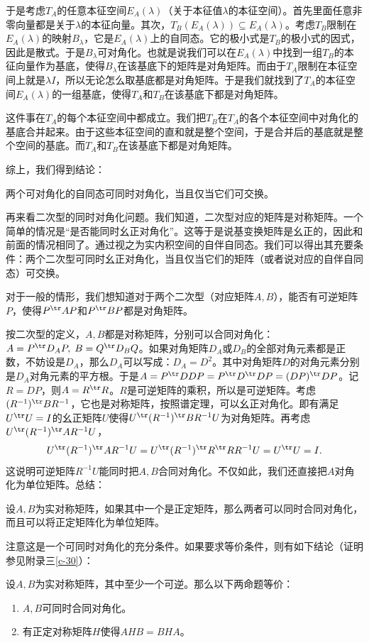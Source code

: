 \documentclass[12pt,UTF8,fontset=none]{ctexbook}
\begin{document}
于是考虑$T_A$的任意本征空间$E_A(\lambda)$（关于本征值$\lambda$的本征空间）。首先里面任意非零向量都是关于$\lambda$的本征向量。其次，$T_B(E_A(\lambda))\subseteq E_A(\lambda)$。考虑$T_B$限制在$E_A(\lambda)$的映射$B_{\lambda}$，它是$E_A(\lambda)$上的自同态。它的极小式是$T_B$的极小式的因式，因此是散式。于是$B_{\lambda}$可对角化。也就是说我们可以在$E_A(\lambda)$中找到一组$T_B$的本征向量作为基底，使得$B_{\lambda}$在该基底下的矩阵是对角矩阵。而由于$T_A$限制在本征空间上就是$\lambda I$，所以无论怎么取基底都是对角矩阵。于是我们就找到了$T_A$的本征空间$E_A(\lambda)$的一组基底，使得$T_A$和$T_B$在该基底下都是对角矩阵。

这件事在$T_A$的每个本征空间中都成立。我们把$T_B$在$T_A$的各个本征空间中对角化的基底合并起来。由于这些本征空间的直和就是整个空间，于是合并后的基底就是整个空间的基底。而$T_A$和$T_B$在该基底下都是对角矩阵。

综上，我们得到结论：
\begin{tm}
    两个可对角化的自同态可同时对角化，当且仅当它们可交换。
\end{tm}

再来看二次型的同时对角化问题。我们知道，二次型对应的矩阵是对称矩阵。一个简单的情况是“是否能同时幺正对角化”。这等于是说基变换矩阵是幺正的，因此和前面的情况相同了。通过视之为实内积空间的自伴自同态。我们可以得出其充要条件：两个二次型可同时幺正对角化，当且仅当它们的矩阵（或者说对应的自伴自同态）可交换。

对于一般的情形，我们想知道对于两个二次型（对应矩阵$A,B$），能否有可逆矩阵$P$，使得$P^{\tr}AP$和$P^{\tr}BP$都是对角矩阵。

按二次型的定义，$A,B$都是对称矩阵，分别可以合同对角化：$A = P^{\tr}D_AP,\; B = Q^{\tr}D_BQ$。如果对角矩阵$D_A$或$D_B$的全部对角元素都是正数，不妨设是$D_A$，那么$D_A$可以写成：$D_A = D^2$。其中对角矩阵$D$的对角元素分别是$D_A$对角元素的平方根。于是$A = P^{\tr}DDP = P^{\tr}D^{\tr}DP = (DP)^{\tr} DP$。记$R=DP$，则$A = R^{\tr} R$。$R$是可逆矩阵的乘积，所以是可逆矩阵。考虑$(R^{-1})^{\tr}BR^{-1}$，它也是对称矩阵，按照谱定理，可以幺正对角化。即有满足$U^{\tr}U=I$的幺正矩阵$U$使得$U^{\tr}(R^{-1})^{\tr}BR^{-1}U$为对角矩阵。再考虑$U^{\tr}(R^{-1})^{\tr}AR^{-1}U$，
\begin{align*}
    U^{\tr}(R^{-1})^{\tr}AR^{-1}U = U^{\tr}(R^{-1})^{\tr}R^{\tr}RR^{-1}U = U^{\tr}U = I.
\end{align*}
这说明可逆矩阵$R^{-1}U$能同时把$A,B$合同对角化。不仅如此，我们还直接把$A$对角化为单位矩阵。总结：
\begin{tm}
    设$A,B$为实对称矩阵，如果其中一个是正定矩阵，那么两者可以同时合同对角化，而且可以将正定矩阵化为单位矩阵。
\end{tm}
注意这是一个可同时对角化的充分条件。如果要求等价条件，则有如下结论（证明参见附录三\ref{c-30}）：\begin{tm}\label{tm:8-2-2}
    设$A,B$为实对称矩阵，其中至少一个可逆。那么以下两命题等价：
    \begin{enumerate}
        \item $A,B$可同时合同对角化。
        \item 有正定对称矩阵$H$使得$AHB=BHA$。
    \end{enumerate}
\end{tm}
\end{document}
